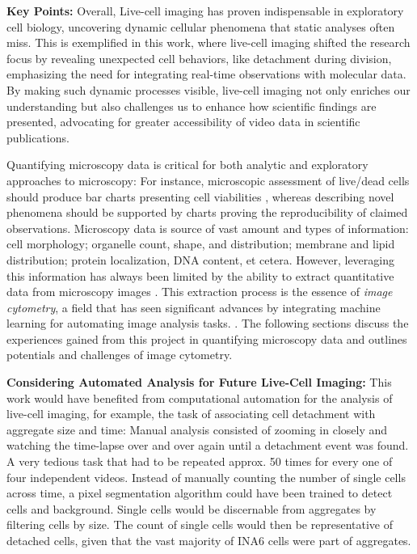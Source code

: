\textbf{Key Points:} Overall, Live-cell imaging has proven indispensable in
exploratory cell biology, uncovering dynamic cellular phenomena that static
analyses often miss. This is exemplified in this work, where live-cell imaging
shifted the research focus by revealing unexpected cell behaviors, like
detachment during division, emphasizing the need for integrating real-time
observations with molecular data. By making such dynamic processes visible,
live-cell imaging not only enriches our understanding but also challenges us to
enhance how scientific findings are presented, advocating for greater
accessibility of video data in scientific publications.

\newpage


%
\label{sec:discussion_quantifying_microscopy}%
Quantifying microscopy data is critical for both analytic and exploratory
approaches to microscopy: For instance, microscopic assessment of live/dead
cells should produce bar charts presenting cell viabilities
\cite{spaepenDigitalImageProcessing2011}, whereas describing novel phenomena
should be supported by charts proving the reproducibility of claimed
observations. Microscopy data is source of vast amount and types of information:
cell morphology; organelle count, shape, and distribution; membrane and lipid
distribution; protein localization, DNA content, et cetera. However, leveraging
this information has always been limited by the ability to extract quantitative
data from microscopy images \cite{galbraithPumpingVolume2023}. This extraction
process is the essence of \emph{image cytometry}, a field that has seen significant
advances by integrating machine learning for automating image analysis tasks.
\cite{guptaDeepLearningImage2019}. The following sections discuss the
experiences gained from this project in quantifying microscopy data and outlines
potentials and challenges of image cytometry.





\textbf{Considering Automated Analysis for Future Live-Cell Imaging:}
This work would have benefited from
computational automation for the analysis of live-cell imaging, for example, the
task of associating \INA cell detachment with \INA aggregate size and time:
Manual analysis consisted of zooming in closely and
watching the time-lapse over and over again until a detachment event was found.
A very tedious task that had to be repeated approx. 50 times for every one of
four independent videos. Instead of manually counting the number of single \INA
cells across time, a pixel segmentation algorithm could have been trained to
detect cells and background. Single cells would be discernable from aggregates
by filtering cells by size. The count of single cells would then be
representative of detached cells, given that the vast majority of INA6 cells
were part of aggregates.


